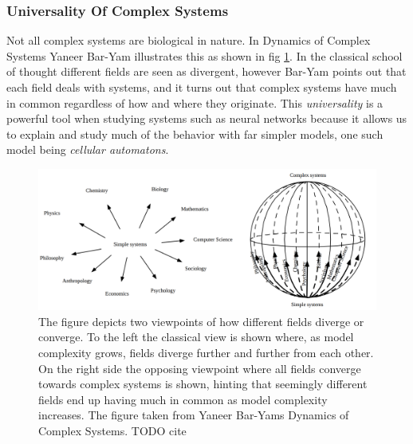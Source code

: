 \subsubsection{Universality Of Complex Systems}
Not all complex systems are biological in nature.
In Dynamics of Complex Systems Yaneer Bar-Yam illustrates this as shown in fig
\ref{figCX}.
In the classical school of thought different fields are seen as divergent,
however Bar-Yam points out that each field deals with systems, and it turns out
that complex systems have much in common regardless of how and where they
originate.
This \emph{universality} is a powerful tool when studying systems such as neural
networks because it allows us to explain and study much of the behavior with far
simpler models, one such model being \emph{cellular automatons}.
\begin{figure}[h!]
  \centering
  \includegraphics[width=1\textwidth]{fig/BarYamCX.png}
  \caption{
    The figure depicts two viewpoints of how different fields diverge or
    converge.
    To the left the classical view is shown where, as model complexity grows,
    fields diverge further and further from each other.
    On the right side the opposing viewpoint where all fields converge towards
    complex systems is shown, hinting that seemingly different fields end up
    having much in common as model complexity increases.
    The figure taken from Yaneer Bar-Yams Dynamics of Complex Systems.
    TODO cite
  }
  \label{figCX}
\end{figure}
